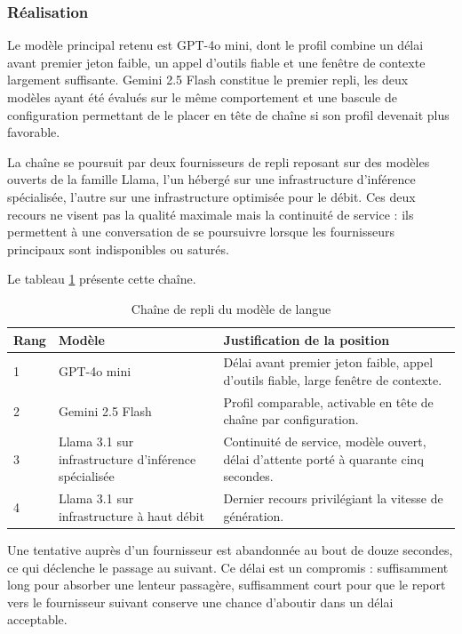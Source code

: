 \subsubsection{Réalisation}

Le modèle principal retenu est GPT-4o mini, dont le profil combine un délai avant premier jeton faible, un appel d'outils fiable et une fenêtre de contexte largement suffisante. Gemini 2.5 Flash constitue le premier repli, les deux modèles ayant été évalués sur le même comportement et une bascule de configuration permettant de le placer en tête de chaîne si son profil devenait plus favorable.

La chaîne se poursuit par deux fournisseurs de repli reposant sur des modèles ouverts de la famille Llama, l'un hébergé sur une infrastructure d'inférence spécialisée, l'autre sur une infrastructure optimisée pour le débit. Ces deux recours ne visent pas la qualité maximale mais la continuité de service : ils permettent à une conversation de se poursuivre lorsque les fournisseurs principaux sont indisponibles ou saturés.

Le tableau \ref{tab:llm-chaine} présente cette chaîne.

\begin{table}[H]
\centering
\renewcommand{\arraystretch}{1.25}
\begin{tabular}{|p{1.2cm}|p{4.2cm}|p{9.1cm}|}
\hline
\textbf{Rang} & \textbf{Modèle} & \textbf{Justification de la position} \\
\hline
1 & GPT-4o mini & Délai avant premier jeton faible, appel d'outils fiable, large fenêtre de contexte. \\
\hline
2 & Gemini 2.5 Flash & Profil comparable, activable en tête de chaîne par configuration. \\
\hline
3 & Llama 3.1 sur infrastructure d'inférence spécialisée & Continuité de service, modèle ouvert, délai d'attente porté à quarante cinq secondes. \\
\hline
4 & Llama 3.1 sur infrastructure à haut débit & Dernier recours privilégiant la vitesse de génération. \\
\hline
\end{tabular}
\caption{Chaîne de repli du modèle de langue}
\label{tab:llm-chaine}
\end{table}

Une tentative auprès d'un fournisseur est abandonnée au bout de douze secondes, ce qui déclenche le passage au suivant. Ce délai est un compromis : suffisamment long pour absorber une lenteur passagère, suffisamment court pour que le report vers le fournisseur suivant conserve une chance d'aboutir dans un délai acceptable.

